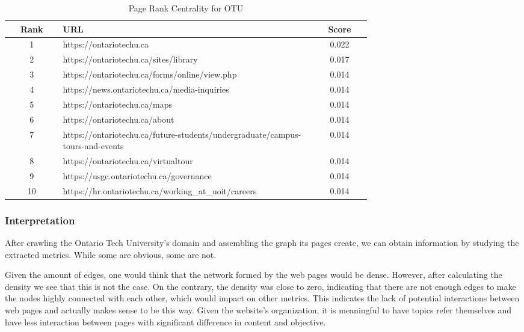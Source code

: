 \begin{table}
    \centering
    \begin{tabular}{|c|p{0.7\linewidth}|c|}
        \hline
        \textbf{Rank} & \textbf{URL} & \textbf{Score} \\
        \hline
        1 & https://ontariotechu.ca & 0.022 \\ \hline
        2 & https://ontariotechu.ca/sites/library & 0.017 \\ \hline
        3 & https://ontariotechu.ca/forms/online/view.php & 0.014 \\ \hline
        4 & https://news.ontariotechu.ca/media-inquiries & 0.014 \\ \hline
        5 & https://ontariotechu.ca/maps & 0.014 \\ \hline
        6 & https://ontariotechu.ca/about & 0.014 \\ \hline
        7 & https://ontariotechu.ca/future-students/undergraduate/campus-tours-and-events & 0.014 \\ \hline
        8 & https://ontariotechu.ca/virtualtour & 0.014 \\ \hline
        9 & https://usgc.ontariotechu.ca/governance & 0.014 \\ \hline
        10 & https://hr.ontariotechu.ca/working\_at\_uoit/careers & 0.014 \\ \hline
    \end{tabular}
    \caption{Page Rank Centrality for OTU}
    \label{table:otu_page_rank}
\end{table}

\subsubsection{Interpretation}
After crawling the Ontario Tech University's domain and assembling the graph its pages create, we can obtain information by studying the extracted metrics. While some are obvious, some are not.

Given the amount of edges, one would think that the network formed by the web pages would be dense. However, after calculating the density we see that this is not the case. On the contrary, the density was close to zero, indicating that there are not enough edges to make the nodes highly connected with each other, which would impact on other metrics. This indicates the lack of potential interactions between web pages and actually makes sense to be this way. Given the website's organization, it is meaningful to have topics refer themselves and have less interaction between pages with significant difference in content and objective.

